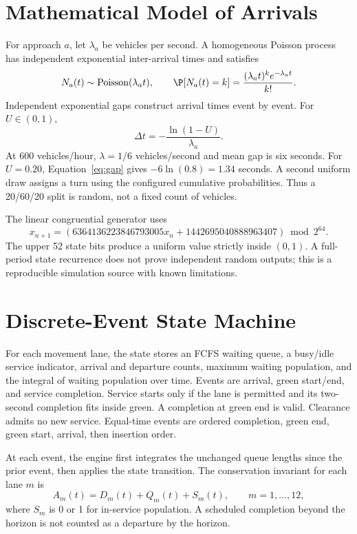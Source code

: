 \documentclass[12pt,a4paper]{report}
\begin{document}
\section{Mathematical Model of Arrivals}
For approach $a$, let $\lambda_a$ be vehicles per second. A homogeneous Poisson process has independent exponential inter-arrival times \cite{taha} and satisfies
\begin{equation}
N_a(t)\sim\operatorname{Poisson}(\lambda_a t),\qquad
\P[N_a(t)=k]=\frac{(\lambda_a t)^k e^{-\lambda_a t}}{k!}.
\end{equation}
Independent exponential gaps construct arrival times event by event. For $U\in(0,1)$,
\begin{equation}\label{eq:gap}
\Delta t=-\frac{\ln(1-U)}{\lambda_a}.
\end{equation}
At 600 vehicles/hour, $\lambda=1/6$ vehicles/second and mean gap is six seconds. For $U=0.20$, Equation~\ref{eq:gap} gives $-6\ln(0.8)=1.34$ seconds. A second uniform draw assigns a turn using the configured cumulative probabilities. Thus a 20/60/20 split is random, not a fixed count of vehicles.

The linear congruential generator uses
\begin{equation}
x_{n+1}=(6364136223846793005x_n+1442695040888963407)\bmod 2^{64}.
\end{equation}
The upper 52 state bits produce a uniform value strictly inside $(0,1)$. A full-period state recurrence does not prove independent random outputs; this is a reproducible simulation source with known limitations.

\section{Discrete-Event State Machine}
For each movement lane, the state stores an FCFS waiting queue, a busy/idle service indicator, arrival and departure counts, maximum waiting population, and the integral of waiting population over time. Events are arrival, green start/end, and service completion. Service starts only if the lane is permitted and its two-second completion fits inside green. A completion at green end is valid. Clearance admits no new service. Equal-time events are ordered completion, green end, green start, arrival, then insertion order.

At each event, the engine first integrates the unchanged queue lengths since the prior event, then applies the state transition. The conservation invariant for each lane $m$ is
\begin{equation}
A_m(t)=D_m(t)+Q_m(t)+S_m(t),\qquad m=1,\ldots,12,
\end{equation}
where $S_m$ is 0 or 1 for in-service population. A scheduled completion beyond the horizon is not counted as a departure by the horizon.
\end{document}
